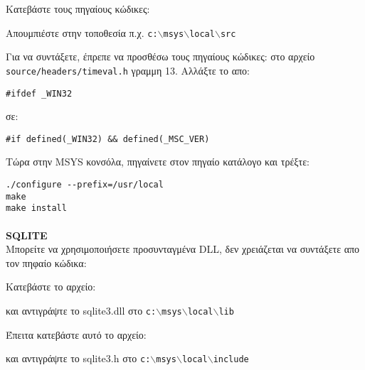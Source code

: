 Κατεβάστε τους πηγαίους κώδικες:

	\begin{quotation}
	\end{quotation}

Απουμπιέστε στην τοποθεσία π.χ. \texttt{c:$\backslash$msys$\backslash$local$\backslash$src}

Για να συντάξετε, έπρεπε να προσθέσω τους πηγαίους κώδικες: στο αρχείο \texttt{source/headers/timeval.h}  γραμμη 13.
Αλλάξτε το απο:

\begin{verbatim}
#ifdef _WIN32
\end{verbatim}
σε:

\begin{verbatim}
#if defined(_WIN32) && defined(_MSC_VER)
\end{verbatim}

Τώρα στην MSYS κονσόλα, πηγαίνετε στον πηγαίο κατάλογο και τρέξτε:

\begin{verbatim}
./configure --prefix=/usr/local
make
make install
\end{verbatim}

\paragraph{}\textbf{SQLITE}\\

Μπορείτε να χρησιμοποιήσετε προσυνταγμένα DLL, δεν χρειάζεται να συντάξετε απο τον πηφαίο κώδικα:

Κατεβάστε το αρχείο:

	\begin{quotation}
	\end{quotation}

και αντιγράψτε το sqlite3.dll στο \texttt{c:$\backslash$msys$\backslash$local$\backslash$lib}

Έπειτα κατεβάστε αυτό το αρχείο:

	\begin{quotation}
	\end{quotation}

και αντιγράψτε το sqlite3.h στο \texttt{c:$\backslash$msys$\backslash$local$\backslash$include}

